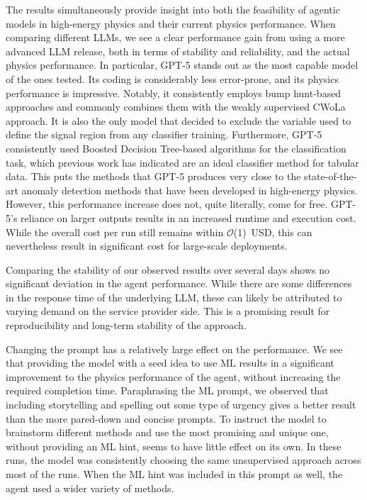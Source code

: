 \documentclass[submission, Phys]{SciPost}
\begin{document}
The results simultaneously provide insight into both the feasibility of agentic models in high-energy physics and their current physics performance. When comparing different LLMs, we see a clear performance gain from using a more advanced LLM release, both in terms of stability and reliability, and the actual physics performance. 
In particular, GPT-5 stands out as the most capable model of the ones tested. Its coding is considerably less error-prone, and its physics performance is impressive. Notably, it consistently employs bump hunt-based approaches and commonly combines them with the weakly supervised CWoLa approach.
It is also the only model that decided to exclude the variable used to define the signal region from any classifier training. 
Furthermore, GPT-5 consistently used Boosted Decision Tree-based algorithms for the classification task, which previous work has indicated are an ideal classifier method for tabular data.
This puts the methods that GPT-5 produces very close to the state-of-the-art anomaly detection methods that have been developed in high-energy physics.
However, this performance increase does not, quite literally, come for free.
GPT-5's reliance on larger outputs results in an increased runtime and execution cost. 
While the overall cost per run still remains within $\mathcal{O}$(1)~USD, this can nevertheless result in significant cost for large-scale deployments.

Comparing the stability of our observed results over several days shows no significant deviation in the agent performance. While there are some differences in the response time of the underlying LLM, these can likely be attributed to varying demand on the service provider side.
This is a promising result for reproducibility and long-term stability of the approach.

Changing the prompt has a relatively large effect on the performance. We see that providing the model with a seed idea to use ML results in a significant improvement to the physics performance of the agent, without increasing the required completion time. Paraphrasing the ML prompt, we observed that including storytelling and spelling out some type of urgency gives a better result than the more pared-down and concise prompts. To instruct the model to brainstorm different methods and use the most promising and unique one, without providing an ML hint, seems to have little effect on its own. In these runs, the model was consistently choosing the same unsupervised approach across most of the runs. When the ML hint was included in this prompt as well, the agent used a wider variety of methods. 
\end{document}
